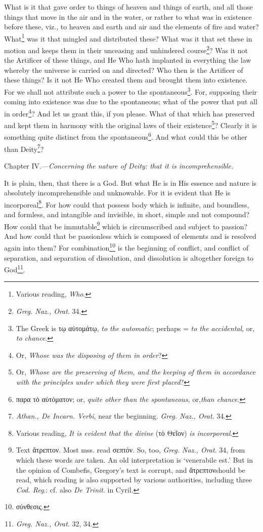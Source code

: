What is it that gave order to things of heaven and things of earth, and all those things that move in the air and in the water, or rather to what was in existence before these, viz., to heaven and earth and air and the elements of fire and water? What\footnote{Various reading, \emph{Who}.} was it that mingled and distributed these? What was it that set these in motion and keeps them in their unceasing and unhindered course\footnote{\emph{Greg. Naz., Orat}. 34.}? Was it not the Artificer of these things, and He Who hath implanted in everything the law whereby the universe is carried on and directed? Who then is the Artificer of these things? Is it not He Who created them and brought them into existence. For we shall not attribute such a power to the spontaneous\footnote{The Greek is \textgreek{τῳ αὐτομάτῳ}, \emph{to the automatic}; perhaps = \emph{to the accidental}, or, \emph{to chance}.}. For, supposing their coming into existence was due to the spontaneous; what of the power that put all in order\footnote{Or, \emph{Whose was the disposing of them in order}?}? And let us grant this, if you please. What of that which has preserved and kept them in harmony with the original laws of their existence\footnote{Or, \emph{Whose are the preserving of them, and the keeping of them in accordance with the principles under which they were first placed}?}? Clearly it is something quite distinct from the spontaneous\footnote{\textgreek{παρα τὸ αὐτόματον}; or, \emph{quite other than the spontaneous, }or,\emph{than chance}.}. And what could this be other than Deity\footnote{\emph{Athan., De Incarn. Verbi}, near the beginning. \emph{Greg. Naz., Orat}. 34.}?


Chapter IV.—\emph{Concerning the nature of Deity: that it is incomprehensible.}

It is plain, then, that there is a God. But what He is in His essence and nature is absolutely incomprehensible and unknowable. For it is evident that He is incorporeal\footnote{Various reading, \emph{It is evident that the divine }(\textgreek{τὸ Θεῖον}) \emph{is incorporeal}.}. For how could that possess body which is infinite, and boundless, and formless, and intangible and invisible, in short, simple and not compound? How could that be immutable\footnote{Text \textgreek{ἄτρεπτον}. Most mss. read \textgreek{σεπτόν}. So, too, \emph{Greg. Naz., Orat}. 34, from which these words are taken. An old interpretation is ‘venerabile est.’ But in the opinion of Combefis, Gregory’s text is corrupt, and \textgreek{ἄτρεπτον}should be read, which reading is also supported by various authorities, including three \emph{Cod. Reg}.: cf. also \emph{De Trinit}. in Cyril.} which is circumscribed and subject to passion? And how could that be passionless which is composed of elements and is resolved again into them? For combination\footnote{\textgreek{σύνθεσις}.} is the beginning of conflict, and conflict of separation, and separation of dissolution, and dissolution is altogether foreign to God\footnote{\emph{Greg. Naz., Orat}. 32, 34.}.


